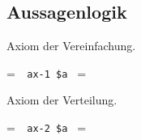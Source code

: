 \newcommand\SLASH{\char`\\~}
\newcommand\TOR{\char`\\/~}
\newcommand\TAND{/\char`\\~}
%
\newlength\mystoreparindent
\newlength\mystorehangindent
\newenvironment{mmraw}{%
\setlength{\mystoreparindent}{\the\parindent}
\setlength{\mystorehangindent}{\the\hangindent}
\setlength{\parindent}{0pt} %
\setlength{\hangindent}{\wd\the\contprefix}
\begin{flushleft}
\begin{frenchspacing}
\begin{tt}
{\unhcopy\startprefix}%
}{%
\end{tt}
\end{frenchspacing}
\end{flushleft}
\setlength{\parindent}{\mystoreparindent}
\setlength{\hangindent}{\mystorehangindent}
\vskip 1ex
}

\subsection{Aussagenlogik}\label{propcalc}

Axiom der Vereinfachung.\label{ax1}

\setbox\startprefix=\hbox{\tt \ \ ax-1\ \$a\ }
\setbox\contprefix=\hbox{\tt \ \ \ \ \ \ \ \ \ \ }
\startm
\m{\vdash}\m{(}\m{\varphi}\m{\rightarrow}\m{(}\m{\psi}\m{\rightarrow}\m{\varphi}\m{)}
\m{)}
\endm

\noindent Axiom der Verteilung.

\setbox\startprefix=\hbox{\tt \ \ ax-2\ \$a\ }
\setbox\contprefix=\hbox{\tt \ \ \ \ \ \ \ \ \ \ }
\startm
\m{\vdash}\m{(}\m{(}\m{\varphi}\m{\rightarrow}\m{(}\m{\psi}\m{\rightarrow}\m{\chi}
\m{)}\m{)}\m{\rightarrow}\m{(}\m{(}\m{\varphi}\m{\rightarrow}\m{\psi}\m{)}\m{
\rightarrow}\m{(}\m{\varphi}\m{\rightarrow}\m{\chi}\m{)}\m{)}\m{)}
\endm

